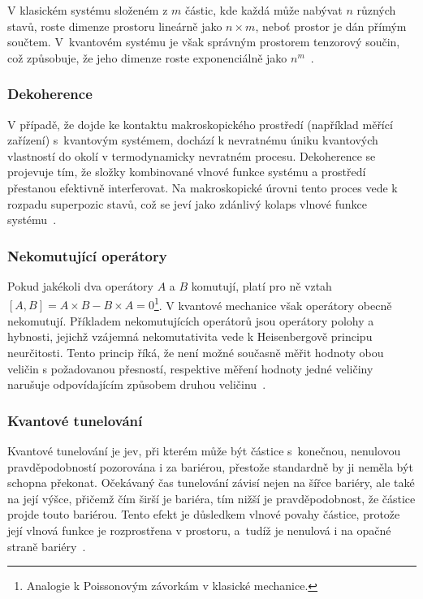 V klasickém systému složeném z $m$ částic, kde každá může nabývat $n$ různých stavů, roste dimenze prostoru lineárně jako $n \times m$, neboť prostor je dán přímým součtem.
V~kvantovém systému je však správným prostorem tenzorový součin, což způsobuje, že jeho dimenze roste exponenciálně jako $n^m$~\cite{NaturalComputing,QuantumComputing-QuantumInformation}.

\subsubsection*{Dekoherence}
V případě, že dojde ke kontaktu makroskopického prostředí (například měřící zařízení) s~kvantovým systémem, dochází k nevratnému úniku kvantových vlastností do okolí v termodynamicky nevratném procesu. 
Dekoherence se projevuje tím, že složky kombinované vlnové funkce systému a prostředí přestanou efektivně interferovat.
Na makroskopické úrovni tento proces vede k rozpadu superpozic stavů, což se jeví jako zdánlivý kolaps vlnové funkce systému~\cite{NaturalComputing}.

\subsubsection*{Nekomutující operátory}
Pokud jakékoli dva operátory $A$ a $B$ komutují, platí pro ně vztah $\left[A, B \right] = A \times B - B \times A = 0$\footnote{Analogie k Poissonovým závorkám v klasické mechanice.}. 
V kvantové mechanice však operátory obecně nekomutují. 
Příkladem nekomutujících operátorů jsou operátory polohy a hybnosti, jejichž vzájemná nekomutativita vede k Heisenbergově principu neurčitosti.
Tento princip říká, že není možné současně měřit hodnoty obou veličin s požadovanou přesností, respektive měření hodnoty jedné veličiny narušuje odpovídajícím způsobem druhou veličinu~\cite{NaturalComputing,QuantumMeasurement}.

\subsubsection*{Kvantové tunelování}
Kvantové tunelování je jev, při kterém může být částice s~konečnou, nenulovou pravděpodobností pozorována i za bariérou, přestože standardně by ji neměla být schopna překonat. 
Očekávaný čas tunelování závisí nejen na šířce bariéry, ale také na její výšce, přičemž čím širší je bariéra, tím nižší je pravděpodobnost, že částice projde touto bariérou. 
Tento efekt je důsledkem vlnové povahy částice, protože její vlnová funkce je rozprostřena v prostoru, a~tudíž je nenulová i na opačné straně bariéry~\cite{NaturalComputing}. 

